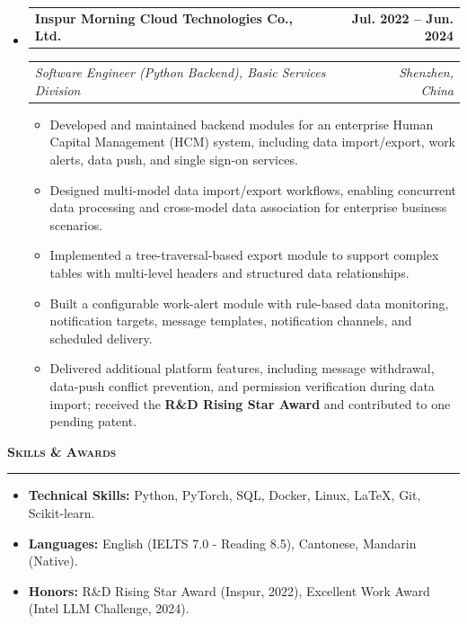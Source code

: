 \documentclass[11pt,letterpaper]{article}
\makeatletter
\newcommand{\cvsection}[1]{%
  \vspace{10pt} 
  {\noindent\Large\bfseries\scshape #1} 
  \par           
  \vspace{2pt}   
  \hrule         
  \vspace{6pt}   
}
\newcommand{\headerrow}[2]
{\begin{tabular*}{\linewidth}{l@{\extracolsep{\fill}}r}
#1 &
#2 \\
\end{tabular*}}
\makeatother
\begin{document}
\begin{itemize}
    \item 
    \headerrow
    {\textbf{Inspur Morning Cloud Technologies Co., Ltd.}}
    {\textbf{Jul. 2022 -- Jun. 2024}}
    \headerrow
    {\emph{Software Engineer (Python Backend), Basic Services Division}}
    {\emph{Shenzhen, China}}
    \begin{itemize}
        \item Developed and maintained backend modules for an enterprise Human Capital Management (HCM) system, including data import/export, work alerts, data push, and single sign-on services.
        \item Designed multi-model data import/export workflows, enabling concurrent data processing and cross-model data association for enterprise business scenarios.
        \item Implemented a tree-traversal-based export module to support complex tables with multi-level headers and structured data relationships.
        \item Built a configurable work-alert module with rule-based data monitoring, notification targets, message templates, notification channels, and scheduled delivery.
        \item Delivered additional platform features, including message withdrawal, data-push conflict prevention, and permission verification during data import; received the \textbf{R\&D Rising Star Award} and contributed to one pending patent.
    \end{itemize}
\end{itemize}

\cvsection{Skills \& Awards}

\begin{itemize}
    \item \textbf{Technical Skills:} Python, PyTorch, SQL, Docker, Linux, LaTeX, Git, Scikit-learn.
    \item \textbf{Languages:} English (IELTS 7.0 - Reading 8.5), Cantonese, Mandarin (Native).
    \item \textbf{Honors:} R\&D Rising Star Award (Inspur, 2022), Excellent Work Award (Intel LLM Challenge, 2024).
\end{itemize}
\end{document}
